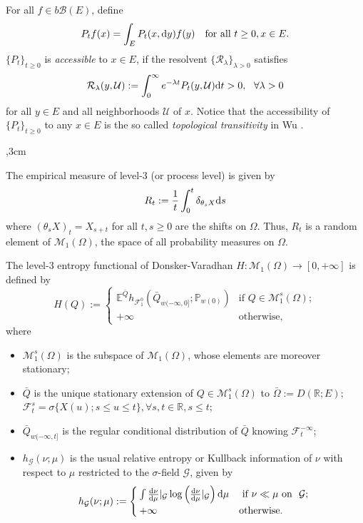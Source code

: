 \documentclass[12pt,a4paper]{article}
\theoremstyle{definition}
\theoremstyle{remark}
\numberwithin{equation}{section}
\newcommand{\R}{\mathbb{R}}
\newcommand{\mcl}{\mathcal}
\newcommand{\dif}{{\rm d}}
\begin{document}
{For all $f\in b\mathcal B(E)$, define
$$
P_tf(x)=\int_E P_t(x, \dif y)f(y)  \ \ \ \text{for all } t\ge0, x\in E.
$$
 $\{P_t\}_{t\ge0}$ is  {\it accessible }to $x \in E$,  if the resolvent $\{\mcl R_{\lambda}\}_{\lambda>0}$ satisfies
$$\mcl R_{\lambda}(y, \mcl U):= \int_0^\infty e^{-\lambda t}P_t(y, \mcl U) \dif t>0 , \ \ \forall \lambda>0$$
for all $y \in E$ and all neighborhoods $\mcl U$ of $x$. Notice that the accessibility of $\{P_t\}_{t\ge0}$ to any $x\in E$ is   the so called {\it topological transitivity} in Wu \cite{Wu01}.




,3cm




The empirical measure of level-$3$ (or process level) is given by
$$
R_t:=\frac1t\int_0^t \delta_{\theta_s X}\dif s
$$
where $(\theta_sX)_t=X_{s+t}$ for all $t, s\ge0$ are the shifts on $\Omega$. Thus, $R_t$ is a random element of $\mathcal M_1(\Omega)$, the space of all probability measures on $\Omega$.



The level-$3$ entropy functional of Donsker-Varadhan $H:\mathcal M_1(\Omega)\rightarrow [0,+\infty]$ is defined by
\begin{equation*} \label{e: DV}
H(Q):=\begin{cases}
 \mathbb E^{\bar Q}h_{\mathcal F_1^0}(\bar Q_{w(-\infty,0]};\mathbb P_{w(0)}) & \text{if } Q\in \mathcal M_1^s(\Omega);  \\
+\infty & \text{otherwise},
\end{cases}
\end{equation*}
where
 \begin{itemize}
   \item $\mathcal M_1^s(\Omega)$ is the subspace of $\mathcal M_1(\Omega)$, whose  elements are moreover stationary;
   \item $\bar Q$ is the unique stationary extension of $Q\in \mathcal M_1^s(\Omega)$ to $\bar \Omega:=D(\mathbb R; E)$; $\mathcal F_t^s=\sigma\{X(u); s\le u\le t\},\forall  s,t\in\R, s\le t$;
   \item $\bar Q_{w(-\infty,t]}$ is the regular conditional distribution of $\bar Q$ knowing $\mathcal F_t^{-\infty}$;
   \item $h_{\mathcal G}(\nu;\mu)$ is the usual relative entropy or Kullback information of $\nu$ with respect to $\mu$ restricted to the $\sigma$-field $\mathcal G$, given by
\begin{equation*}
h_{\mathcal G}(\nu;\mu):=\begin{cases}
  \int\frac{\dif\nu}{\dif\mu}|_{\mathcal G} \log\left(\frac{\dif\nu}{\dif\mu}|_{\mathcal G}\right) \dif\mu & \text{ if }  \nu\ll \mu \text{ on } \ \mathcal G;  \\
+\infty & \text{otherwise}.
\end{cases}
\end{equation*}
 \end{itemize}

}
\end{document}
